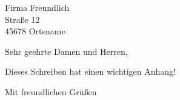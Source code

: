 \documentclass[%
    alignment       = standard,%
    visualize       = false,%
    mainaccentcolor = guardsmanred,%
    otheraccentcolor = gray,%
    layercolor      = black,%
    mainlanguage    = ngerman,%
    verbosedate     = true,%
    verboseplace    = true,%
    refvpos         = 225 pt,%
    toaddrheight    = 92pt,%
]{my-letter}
\begin{document}
\begin{letter}{Firma Freundlich\\Straße 12\\45678 Ortsname}

    \opening{Sehr geehrte Damen und Herren,}

    \kant[1]

    Dieses Schreiben hat einen wichtigen Anhang!

    \closing{Mit freundlichen Grüßen}


\end{letter}

\end{document}

